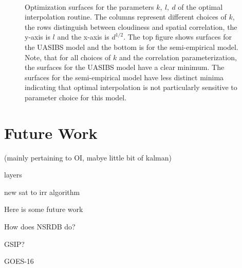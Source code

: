 \begin{figure}[p]
\centering
\captionsetup[subfigure]{labelformat=empty}
\vspace{-1em} \\
\caption[Optimization surfaces for OI parameters]{Optimization
  surfaces for the parameters $k,\: l,\: d$ of the optimal
  interpolation routine. The columns represent different choices of
  $k$, the rows distinguish between cloudiness and spatial
  correlation, the y-axis is $l$ and the x-axis is $d^{1/2}$. The top
  figure shows surfaces for the UASIBS model and the bottom is for the
  semi-empirical model. Note, that for all choices of $k$ and the
  correlation parameterization, the surfaces for the UASIBS model have
  a clear minimum. The surfaces for the semi-empirical model have less
  distinct minima indicating that optimal interpolation is not
  particularly sensitive to parameter choice for this model.}
\label{fig:paramopt}
\end{figure}


\section{Future Work}
(mainly pertaining to OI, mabye little bit of kalman)

layers

new sat to irr algorithm

Here is some future work

How does NSRDB do?

GSIP?

GOES-16

